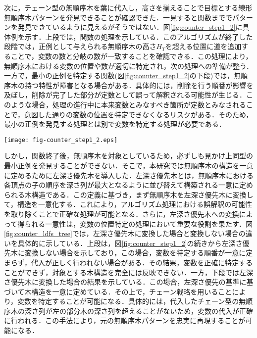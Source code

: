 次に，チェーン型の無順序木を葉に代入し，高さを揃えることで目標とする線形無順序木パターンを発見できることが確認できた．一見すると関数まででパターンを発見できているように見えるがそうではない．図\ref{fig:counter_step1_2}に具体例を示す．上段では，関数の処理を示している．このアルゴリズムが終了した段階では，正例として与えられる無順序木の高さ$H_T$を超える位置に道を追加することで，変数の数と分岐の数が一致することを確認できる．この処理により，無順序木における変数の位置や数が適切に特定され，次の処理への準備が整う．
一方で，最小の正例を特定する関数(図\ref{fig:counter_step1_2}の下段)では，無順序木の持つ特性が障害となる場合がある．具体的には，削除を行う順番が影響を及ぼし，削除が完了した部分が定数として誤って解釈される可能性が生じる．このような場合，処理の進行中に本来変数とみなすべき箇所が定数とみなされることで，意図した通りの変数の位置を特定できなくなるリスクがある．そのため，最小の正例を発見する処理とは別で変数を特定する処理が必要である．

\begin{figure*}[tb]
  \centering
  \texttt{[image: fig-counter\_step1\_2.eps]}
  \caption{線形無順序木パターン$t$と正例となる無順序木$T$に対して，最小正例を発見するまでで処理を終了すると，熊手型の無順序木が存在する箇所と変数であるべき位置が一致しないため，パターンの発見には至らない．}\label{fig:counter_step1_2}
\end{figure*}

しかし，関数終了後，無順序木を対象としているため，必ずしも見かけ上同型の最小正例を発見することができない．そこで，本研究では無順序木の構造を一意に定めるために左深さ優先木を導入した．左深さ優先木とは，無順序木における各頂点の子の順序を深さ列が最大となるように並び替えて構築される一意に定められる木構造である．この定義に基づき，まず無順序木を左深さ優先木に変換して，構造を一意化する．これにより，アルゴリズム処理における誤解釈の可能性を取り除くことで正確な処理が可能となる．さらに，左深さ優先木への変換によって得られる一意性は，変数の位置特定の処理において重要な役割を果たす．図\ref{fig:counter_ldfs_tree}では，左深さ優先木に変換した場合と変換しない場合の違いを具体的に示している．上段は，図\ref{fig:counter_step1_2}の続きから左深さ優先木に変換しない場合を示しており，この場合，変数を特定する順番が一意に定まらず，代入が正しく行われない場合がある．その結果，変数を正確に特定することができず，対象とする木構造を完全には反映できない．一方，下段では左深さ優先木に変換した場合の結果を示している．この場合，左深さ優先の基準に基づいて木構造を一意に定めている．その上で，チェーン戦略を用いることにより，変数を特定することが可能になる．具体的には，代入したチェーン型の無順序木の深さ列が左の部分木の深さ列を超えることがないため，変数の代入が正確に行われる．この手法により，元の無順序木パターンを忠実に再現することが可能になる．

